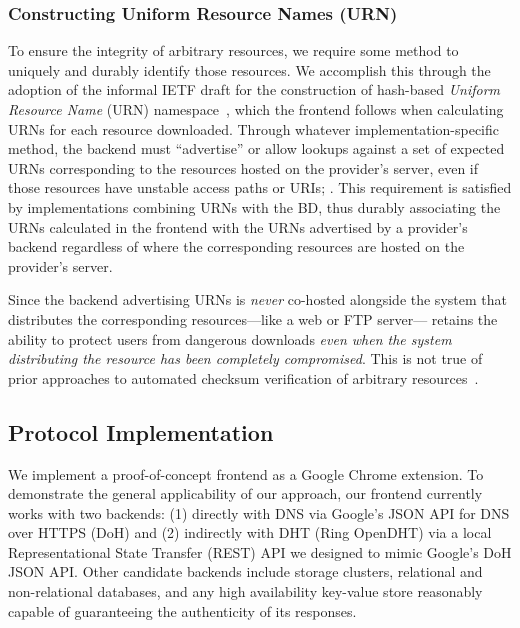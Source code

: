 \subsubsection{Constructing Uniform Resource Names (URN)}

To ensure the integrity of arbitrary resources, we require some method to
uniquely and durably identify those resources. We accomplish this through the
adoption of the informal IETF draft for the construction of hash-based
\emph{Uniform Resource Name} (URN) namespace~\cite{draft-URN}, which the
frontend follows when calculating URNs for each resource downloaded. Through
whatever implementation-specific method, the backend must ``advertise'' or allow
lookups against a set of expected URNs corresponding to the resources hosted on
the provider's server, even if those resources have unstable access paths or
URIs; . This requirement is satisfied by implementations combining URNs with
the BD, thus durably associating the URNs calculated in the frontend with the
URNs advertised by a provider's backend regardless of where the corresponding
resources are hosted on the provider's server.

Since the backend advertising URNs is \emph{never} co-hosted alongside the
system that distributes the corresponding resources---like a web or FTP
server---\SYSTEM{} retains the ability to protect users from dangerous downloads
\emph{even when the system distributing the resource has been completely
compromised}. This is not true of prior approaches to automated checksum
verification of arbitrary resources~\cite{Cherubini}.

\subsection{Protocol Implementation}


We implement a proof-of-concept \SYSTEM{} frontend as a Google Chrome extension.
To demonstrate the general applicability of our approach, our frontend currently
works with two backends: (1) directly with DNS via Google's JSON API for DNS
over HTTPS (DoH) and (2) indirectly with DHT (Ring OpenDHT) via a local
Representational State Transfer (REST) API we designed to mimic Google's DoH
JSON API. Other candidate backends include storage clusters, relational and
non-relational databases, and any high availability key-value store reasonably
capable of guaranteeing the authenticity of its responses.

